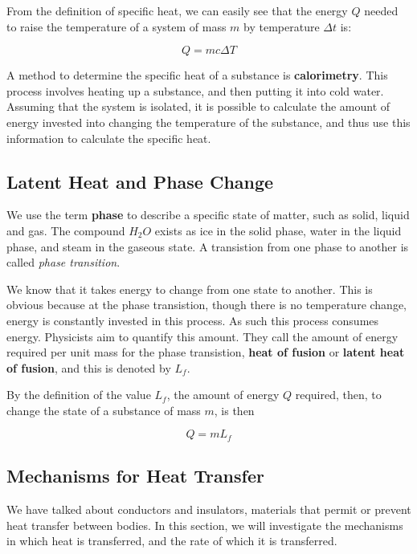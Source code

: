 From the definition of specific heat, we can easily see that the energy $Q$ needed to raise the temperature of a system of mass $m$ by temperature $\Delta t$ is:

\begin{form}
$$Q=mc\Delta T$$
\end{form}

A method to determine the specific heat of a substance is \textbf{calorimetry}. This process involves heating up a substance, and then putting it into cold water. Assuming that the system is isolated, it is possible to calculate the amount of energy invested into changing the temperature of the substance, and thus use this information to calculate the specific heat.

\subsection{Latent Heat and Phase Change}
We use the term \textbf{phase} to describe a specific state of matter, such as solid, liquid and gas.
The compound $H_2O$ exists as ice in the solid phase, water in the liquid phase, and steam in the gaseous state. A transistion from one phase to another is called \textit{phase transition}.

We know that it takes energy to change from one state to another. This is obvious because at the phase transistion, though there is no temperature change, energy is constantly invested in this process. As such this process consumes energy. Physicists aim to quantify this amount. They call the amount of energy required per unit mass for the phase transistion, \textbf{heat of fusion} or \textbf{latent heat of fusion}, and this is denoted by $L_f$.

By the definition of the value $L_f$, the amount of energy $Q$ required, then, to change the state of a substance of mass $m$, is then
\begin{form}
$$Q=mL_f$$
\end{form}

\subsection{Mechanisms for Heat Transfer}
We have talked about conductors and insulators, materials that permit or prevent heat transfer between bodies. In this section, we will investigate the mechanisms in which heat is transferred, and the rate of which it is transferred.

